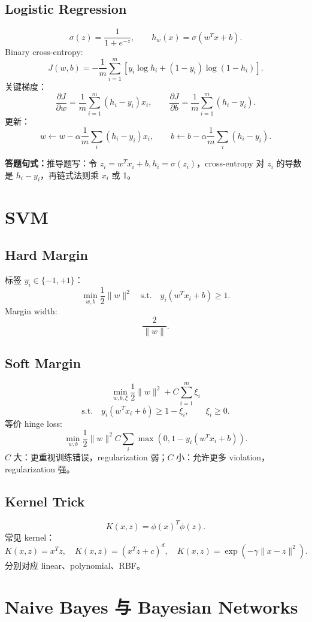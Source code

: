 \documentclass[UTF8,11pt,a4paper]{ctexart}
\newcommand{\ans}[1]{\textbf{答题句式：}#1}
\begin{document}
\subsection{Logistic Regression}

\[
\sigma(z)=\frac{1}{1+e^{-z}},\qquad h_w(x)=\sigma(w^Tx+b).
\]
Binary cross-entropy:
\[
J(w,b)=-\frac1m\sum_{i=1}^m
\left[y_i\log h_i+(1-y_i)\log(1-h_i)\right].
\]
关键梯度：
\[
\frac{\partial J}{\partial w}=\frac1m\sum_{i=1}^m(h_i-y_i)x_i,\qquad
\frac{\partial J}{\partial b}=\frac1m\sum_{i=1}^m(h_i-y_i).
\]
更新：
\[
w\leftarrow w-\alpha\frac1m\sum_i(h_i-y_i)x_i,\qquad
b\leftarrow b-\alpha\frac1m\sum_i(h_i-y_i).
\]

\ans{推导题写：令 $z_i=w^Tx_i+b,h_i=\sigma(z_i)$，cross-entropy 对 $z_i$ 的导数是 $h_i-y_i$，再链式法则乘 $x_i$ 或 1。}

\section{SVM}

\subsection{Hard Margin}

标签 $y_i\in\{-1,+1\}$：
\[
\min_{w,b}\frac12\|w\|^2
\quad\text{s.t.}\quad
y_i(w^Tx_i+b)\ge 1.
\]
Margin width:
\[
\frac{2}{\|w\|}.
\]

\subsection{Soft Margin}

\[
\min_{w,b,\xi}\frac12\|w\|^2+C\sum_{i=1}^m\xi_i
\]
\[
\text{s.t.}\quad y_i(w^Tx_i+b)\ge 1-\xi_i,\qquad \xi_i\ge0.
\]
等价 hinge loss:
\[
\min_{w,b}\frac12\|w\|^2
C\sum_i\max(0,1-y_i(w^Tx_i+b)).
\]
$C$ 大：更重视训练错误，regularization 弱；$C$ 小：允许更多 violation，regularization 强。

\subsection{Kernel Trick}

\[
K(x,z)=\phi(x)^T\phi(z).
\]
常见 kernel：
\[
K(x,z)=x^Tz,\quad K(x,z)=(x^Tz+c)^d,\quad
K(x,z)=\exp(-\gamma\|x-z\|^2).
\]
分别对应 linear、polynomial、RBF。

\section{Naive Bayes 与 Bayesian Networks}
\end{document}
